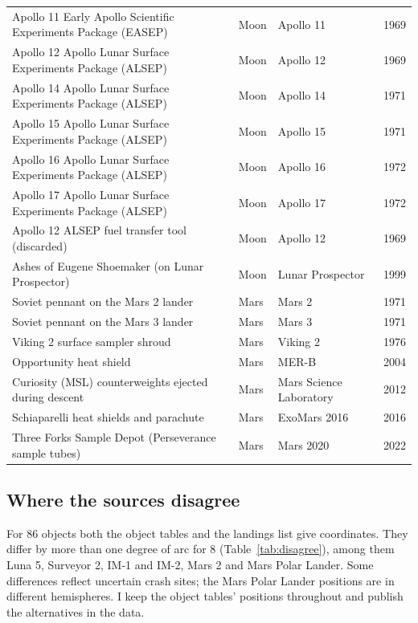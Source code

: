 \documentclass[11pt,a4paper]{article}
\begin{document}
\begin{footnotesize}
\begin{longtable}{p{8.2cm}lp{3.4cm}r}
Apollo 11 Early Apollo Scientific Experiments Package (EASEP) & Moon & Apollo 11 & 1969\\
Apollo 12 Apollo Lunar Surface Experiments Package (ALSEP) & Moon & Apollo 12 & 1969\\
Apollo 14 Apollo Lunar Surface Experiments Package (ALSEP) & Moon & Apollo 14 & 1971\\
Apollo 15 Apollo Lunar Surface Experiments Package (ALSEP) & Moon & Apollo 15 & 1971\\
Apollo 16 Apollo Lunar Surface Experiments Package (ALSEP) & Moon & Apollo 16 & 1972\\
Apollo 17 Apollo Lunar Surface Experiments Package (ALSEP) & Moon & Apollo 17 & 1972\\
Apollo 12 ALSEP fuel transfer tool (discarded) & Moon & Apollo 12 & 1969\\
Ashes of Eugene Shoemaker (on Lunar Prospector) & Moon & Lunar Prospector & 1999\\
Soviet pennant on the Mars 2 lander & Mars & Mars 2 & 1971\\
Soviet pennant on the Mars 3 lander & Mars & Mars 3 & 1971\\
Viking 2 surface sampler shroud & Mars & Viking 2 & 1976\\
Opportunity heat shield & Mars & MER-B & 2004\\
Curiosity (MSL) counterweights ejected during descent & Mars & Mars Science Laboratory & 2012\\
Schiaparelli heat shields and parachute & Mars & ExoMars 2016 & 2016\\
Three Forks Sample Depot (Perseverance sample tubes) & Mars & Mars 2020 & 2022\\
\bottomrule\end{longtable}\end{footnotesize}

\subsection{Where the sources disagree}
For 86 objects both the object tables and the landings list give coordinates. They differ by more than one degree of arc for 8 (Table~\ref{tab:disagree}), among them Luna 5, Surveyor 2, IM-1 and IM-2, Mars 2 and Mars Polar Lander. Some differences reflect uncertain crash sites; the Mars Polar Lander positions are in different hemispheres. I keep the object tables' positions throughout and publish the alternatives in the data.
\end{document}
